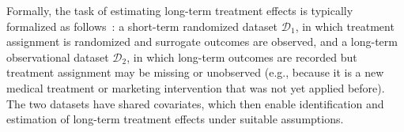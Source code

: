 \documentclass{article}
\theoremstyle{plain}
\theoremstyle{definition}
\theoremstyle{remark}
\newcommand{\1}{\mathds{1}}                %
\newcommand{\TODO}[1]{\textcolor{lightred}{#1}}
\begin{document}


Formally, the task of estimating long-term treatment effects is typically formalized as follows~\cite{Chen.2023, Yang.2024-Targeting, Athey.2025}: a short-term randomized dataset $\mathcal{D}_1$, in which treatment assignment is randomized and surrogate outcomes are observed, and a long-term observational dataset $\mathcal{D}_2$, in which long-term outcomes are recorded but treatment assignment may be missing or unobserved (e.g., because it is a new medical treatment or marketing intervention that was not yet applied before). The two datasets have shared covariates, which then enable identification and estimation of long-term treatment effects under suitable assumptions. 




\end{document}
